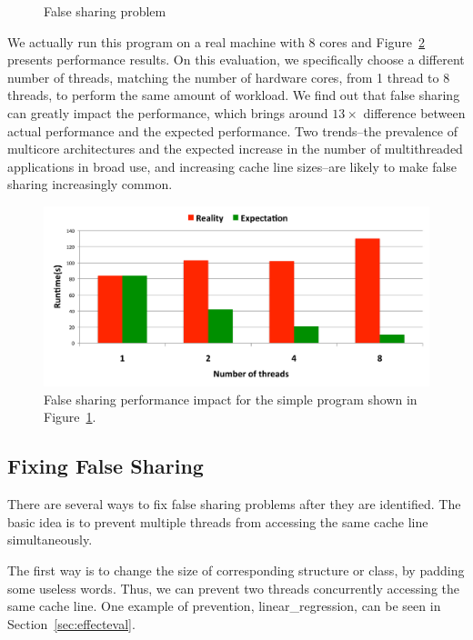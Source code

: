 \begin{figure}[!ht]
{\centering
\fbox{
\subfigure{}
\hspace{20pt}
\subfigure{}
}
\caption{False sharing problem
\label{fig:falsesharingexample}}
}
\end{figure}

We actually run this program on a real machine with 8 cores and Figure~\ref{fig:fsperfimpact} presents performance results. On this evaluation, we specifically choose a different number of threads, matching the number of hardware cores, from 1 thread to 8 threads, to perform the same amount of workload. We find out that false sharing can greatly impact the performance, which brings around $13\times$ difference between actual performance and the expected performance. Two trends--the prevalence of multicore architectures and
the expected increase in the number of multithreaded applications in broad use, and increasing cache line sizes--are likely to make false sharing increasingly common.

\begin{figure}[!t]
\centering
\includegraphics[width=6in]{fig/fsperfimpact.pdf}
\caption{
False sharing performance impact for the simple program shown in Figure~\ref{fig:falsesharingexample}.
\label{fig:fsperfimpact}
}
\end{figure}

\subsection{Fixing False Sharing}
There are several ways to fix false sharing problems after they are identified. The basic idea is to prevent multiple threads from accessing the same cache line simultaneously.  

The first way is to change the size of corresponding structure or class, by padding some useless words. Thus, we can prevent two threads concurrently accessing the same cache line. One example of prevention, linear\_regression, can be seen in Section~\ref{sec:effecteval}.

